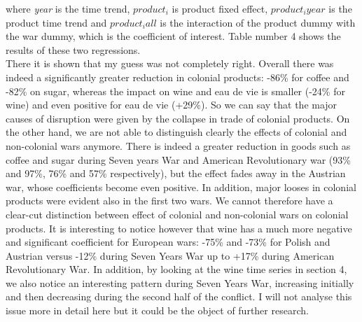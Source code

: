 \documentclass[12pt,a4paper,titlepage]{article}
\begin{document}
where \textit{year} is the time trend, $product_i$ is product fixed effect, $product_iyear$ is the product time trend and $product_iall$ is the interaction of the product dummy with the war dummy, which is the coefficient of interest. Table number 4 shows the results of these two regressions. \\
There it is shown that my guess was not completely right. Overall there was indeed a significantly greater reduction in colonial products: -86\% for coffee and -82\% on sugar, whereas the impact on wine and eau de vie is smaller (-24\% for wine) and even positive for eau de vie (+29\%).  So we can say that the major causes of disruption were given by the collapse in trade of colonial products. On the other hand, we are not able to distinguish clearly the effects of colonial and non-colonial wars anymore. There is indeed a greater reduction in goods such as coffee and sugar during Seven years War and American Revolutionary war (93\% and 97\%, 76\% and 57\% respectively), but the effect fades away in the Austrian war, whose coefficients become even positive. In addition, major looses in colonial products were evident also in the first two wars. We cannot therefore have a clear-cut distinction between effect of colonial and non-colonial wars on colonial products. It is interesting to notice however that wine has a much more negative and significant coefficient for European wars: -75\% and -73\% for Polish and Austrian versus -12\% during Seven Years War up to +17\% during American Revolutionary War. In addition, by looking at the wine time series in section 4, we also notice an interesting pattern during Seven Years War, increasing initially and then decreasing during the second half of the conflict.  I will not analyse this issue more in detail here but it could be the object of further research. 
\end{document}
